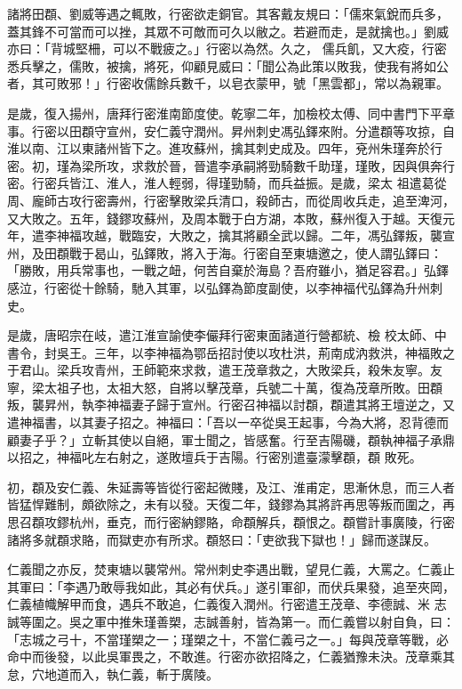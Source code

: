 \begin{pinyinscope}
 諸將田頵、劉威等遇之輒敗，行密欲走銅官。其客戴友規曰：「儒來氣銳而兵多，蓋其鋒不可當而可以挫，其眾不可敵而可久以敝之。若避而走，是就擒也。」劉威亦曰：「背城堅柵，可以不戰疲之。」行密以為然。久之，
 儒兵飢，又大疫，行密悉兵擊之，儒敗，被擒，將死，仰顧見威曰：「聞公為此策以敗我，使我有將如公者，其可敗邪！」行密收儒餘兵數千，以皂衣蒙甲，號「黑雲都」，常以為親軍。



 是歲，復入揚州，唐拜行密淮南節度使。乾寧二年，加檢校太傅、同中書門下平章事。行密以田頵守宣州，安仁義守潤州。昇州刺史馮弘鐸來附。分遣頵等攻掠，自淮以南、江以東諸州皆下之。進攻蘇州，擒其刺史成及。四年，兗州朱瑾奔於行密。初，瑾為梁所攻，求救於晉，晉遣李承嗣將勁騎數千助瑾，瑾敗，因與俱奔行密。行密兵皆江、淮人，淮人輕弱，得瑾勁騎，而兵益振。是歲，梁太
 祖遣葛從周、龐師古攻行密壽州，行密擊敗梁兵清口，殺師古，而從周收兵走，追至渒河，又大敗之。五年，錢鏐攻蘇州，及周本戰于白方湖，本敗，蘇州復入于越。天復元年，遣李神福攻越，戰臨安，大敗之，擒其將顧全武以歸。二年，馮弘鐸叛，襲宣州，及田頵戰于曷山，弘鐸敗，將入于海。行密自至東塘邀之，使人謂弘鐸曰：「勝敗，用兵常事也，一戰之衄，何苦自棄於海島？吾府雖小，猶足容君。」弘鐸感泣，行密從十餘騎，馳入其軍，以弘鐸為節度副使，以李神福代弘鐸為升州刺史。



 是歲，唐昭宗在岐，遣江淮宣諭使李儼拜行密東面諸道行營都統、檢
 校太師、中書令，封吳王。三年，以李神福為鄂岳招討使以攻杜洪，荊南成汭救洪，神福敗之于君山。梁兵攻青州，王師範來求救，遣王茂章救之，大敗梁兵，殺朱友寧。友寧，梁太祖子也，太祖大怒，自將以擊茂章，兵號二十萬，復為茂章所敗。田頵叛，襲昇州，執李神福妻子歸于宣州。行密召神福以討頵，頵遣其將王壇逆之，又遣神福書，以其妻子招之。神福曰：「吾以一卒從吳王起事，今為大將，忍背德而顧妻子乎？」立斬其使以自絕，軍士聞之，皆感奮。行至吉陽磯，頵執神福子承鼎以招之，神福叱左右射之，遂敗壇兵于吉陽。行密別遣臺濛擊頵，頵
 敗死。



 初，頵及安仁義、朱延壽等皆從行密起微賤，及江、淮甫定，思漸休息，而三人者皆猛悍難制，頗欲除之，未有以發。天復二年，錢鏐為其將許再思等叛而圍之，再思召頵攻鏐杭州，垂克，而行密納鏐賂，命頵解兵，頵恨之。頵嘗計事廣陵，行密諸將多就頵求賂，而獄吏亦有所求。頵怒曰：「吏欲我下獄也！」歸而遂謀反。



 仁義聞之亦反，焚東塘以襲常州。常州刺史李遇出戰，望見仁義，大罵之。仁義止其軍曰：「李遇乃敢辱我如此，其必有伏兵。」遂引軍卻，而伏兵果發，追至夾岡，仁義植幟解甲而食，遇兵不敢追，仁義復入潤州。行密遣王茂章、李德誠、米
 志誠等圍之。吳之軍中推朱瑾善槊，志誠善射，皆為第一。而仁義嘗以射自負，曰：「志城之弓十，不當瑾槊之一；瑾槊之十，不當仁義弓之一。」每與茂章等戰，必命中而後發，以此吳軍畏之，不敢進。行密亦欲招降之，仁義猶豫未決。茂章乘其怠，穴地道而入，執仁義，斬于廣陵。




\end{pinyinscope}

